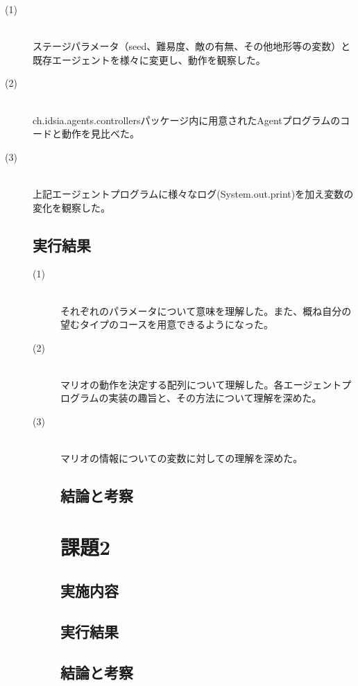 \documentclass[a4j]{jarticle}
\begin{document}
\begin{description}
\item[(1)]\mbox{}\\
ステージパラメータ（seed、難易度、敵の有無、その他地形等の変数）と既存エージェントを様々に変更し、動作を観察した。
\item[(2)]\mbox{}\\
ch.idsia.agents.controllersパッケージ内に用意されたAgentプログラムのコードと動作を見比べた。
\item[(3)]\mbox{}\\
上記エージェントプログラムに様々なログ(System.out.print)を加え変数の変化を観察した。

\subsection{実行結果}
\begin{description}
\item[(1)]\mbox{}\\
それぞれのパラメータについて意味を理解した。また、概ね自分の望むタイプのコースを用意できるようになった。
\item[(2)]\mbox{}\\
マリオの動作を決定する配列について理解した。各エージェントプログラムの実装の趣旨と、その方法について理解を深めた。
\item[(3)]\mbox{}\\
マリオの情報についての変数に対しての理解を深めた。

\subsection{結論と考察}


\newpage

\section{課題2}
\subsection{実施内容}
\subsection{実行結果}
\subsection{結論と考察}




\end{description}
\end{description}
\end{document}
